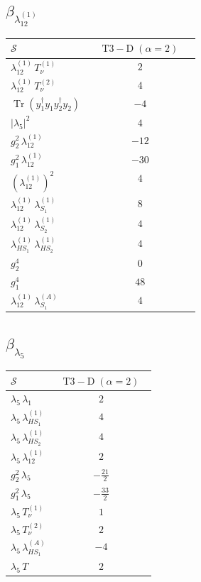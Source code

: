 \documentclass[9pt]{article}
\begin{document}
\subsection*{$ \beta_{\lambda_{12}^{(1)}} $}
\begin{longtable}{@{}p{0.31\linewidth}c@{}}
\toprule
$\mathcal{S}$ & $ \mathrm{T3-D}\;(\alpha=2) $ \\
\midrule
$ \lambda_{12}^{(1)}\,T_{\nu}^{(1)} $ & $ 2 $ \\
$ \lambda_{12}^{(1)}\,T_{\nu}^{(2)} $ & $ 4 $ \\
$ \operatorname{Tr}(y_1^\dagger y_1y_2^\dagger y_2) $ & $ -4 $ \\
$ |\lambda_5|^2 $ & $ 4 $ \\
$ g_2^2\,\lambda_{12}^{(1)} $ & $ -12 $ \\
$ g_1^2\,\lambda_{12}^{(1)} $ & $ -30 $ \\
$ \left(\lambda_{12}^{(1)}\right)^2 $ & $ 4 $ \\
$ \lambda_{12}^{(1)}\,\lambda_{S_1}^{(1)} $ & $ 8 $ \\
$ \lambda_{12}^{(1)}\,\lambda_{S_2}^{(1)} $ & $ 4 $ \\
$ \lambda_{HS_1}^{(1)}\,\lambda_{HS_2}^{(1)} $ & $ 4 $ \\
$ g_2^4 $ & $ 0 $ \\
$ g_1^4 $ & $ 48 $ \\
$ \lambda_{12}^{(1)}\,\lambda_{S_1}^{(A)} $ & $ 4 $ \\
\bottomrule
\end{longtable}
\subsection*{$ \beta_{\lambda_5} $}
\begin{longtable}{@{}p{0.31\linewidth}c@{}}
\toprule
$\mathcal{S}$ & $ \mathrm{T3-D}\;(\alpha=2) $ \\
\midrule
$ \lambda_5\,\lambda_1 $ & $ 2 $ \\
$ \lambda_5\,\lambda_{HS_1}^{(1)} $ & $ 4 $ \\
$ \lambda_5\,\lambda_{HS_2}^{(1)} $ & $ 4 $ \\
$ \lambda_5\,\lambda_{12}^{(1)} $ & $ 2 $ \\
$ g_2^2\,\lambda_5 $ & $ - \frac{21}{2} $ \\
$ g_1^2\,\lambda_5 $ & $ - \frac{33}{2} $ \\
$ \lambda_5\,T_{\nu}^{(1)} $ & $ 1 $ \\
$ \lambda_5\,T_{\nu}^{(2)} $ & $ 2 $ \\
$ \lambda_5\,\lambda_{HS_1}^{(A)} $ & $ -4 $ \\
$ \lambda_5\,T $ & $ 2 $ \\
\bottomrule
\end{longtable}
\end{document}
